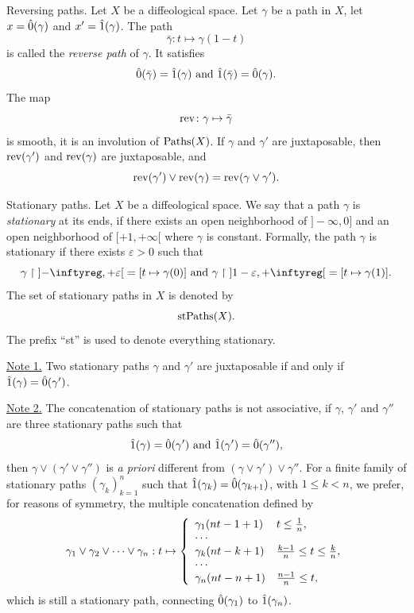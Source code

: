 \begin{Article}{Reversing paths.}{}
  \label{Reversing-paths}
  Let $X$ be a diffeological space.
  Let $\gamma$ be a path in $X$, let $x = \hat 0(\gamma)$ and $x' = \hat 1(\gamma)$.
  The path
  $$%
  \bar \gamma \colon t \mapsto \gamma(1-t)
  $$%
  is called the \emph{reverse path} of $\gamma$.
  It satisfies
  $$%
  \0(\bar \gamma) = \1(\gamma)
  \SpacedText{and}
  \1(\bar \gamma) = \0(\gamma).
  $$%
  The map
  $$%
  \Rev \colon \gamma \mapsto \bar \gamma
  $$%
  is  smooth,
  it is an involution of $\operatorname{Paths}(X)$.
  If $\gamma$ and $\gamma'$ are juxtaposable,
  then $\operatorname{rev}(\gamma')$ and $\operatorname{rev}(\gamma)$ are juxtaposable,
  and
  $$%
  \Rev(\gamma') \vee \Rev(\gamma) = \Rev(\gamma \vee \gamma').
  $$%
\end{Article} %

\begin{Article}{Stationary paths.}{}
  \label{Stationary-paths}
  Let $X$ be a diffeological space.
  We say that a path $\gamma$ is \emph{stationary} at its ends,
  if there exists an open neighborhood of $]-\infty,0]$ and  an open neighborhood of $[+1,+\infty[$ where $\gamma$ is constant.
  Formally,
  the path $\gamma$ is stationary if there exists $\varepsilon > 0$ such that
  $$%
    \gamma \restriction \OpenInterval{-\infty, + \varepsilon} = [t \mapsto \gamma(0)]
    \SpacedText{and}
    \gamma \restriction \OpenInterval{1 - \varepsilon, + \infty} = [t \mapsto \gamma(1)].
  $$%
  The set of stationary paths in $X$ is denoted by
  $$%
  \stPaths(X).
  $$%
  The prefix ``st'' is used to denote everything stationary.

  \uline{Note 1.} Two stationary paths $\gamma$ and $\gamma'$ are juxtaposable if and only if $\hat 1(\gamma) = \hat 0(\gamma')$.

  \uline{Note 2.} The concatenation of stationary paths is not associative,
  if $\gamma$, $\gamma'$ and $\gamma''$ are three stationary paths such that
  $$%
  \1(\gamma) = \0(\gamma')
  \SpacedText{and}
  \1(\gamma') = \0(\gamma''),
  $$%
  then $\gamma \vee (\gamma' \vee \gamma'')$ is {\em a priori\/} different from $(\gamma \vee \gamma') \vee \gamma''$.
  For a finite family of stationary paths $(\gamma_k)_{k=1}^n$ such that $\hat 1(\gamma_k) = \hat 0(\gamma_{k+1})$,
  with \hbox{$1\leq k<n$}, %
  we prefer,
  for reasons of symmetry,
  the multiple concatenation defined by
  $$%
  \gamma_1 \vee \gamma_2 \vee \cdots \vee \gamma_n : t
  \mapsto
  \left\{
  \begin{array}{ll}
    \gamma_1(nt - 1 +1) & t \leq {1 \over n}, \\
    \cdots \\
    \gamma_k(nt -k +1 ) & {k -1 \over n} \leq t \leq {k \over n}, \\
    \cdots \\
    \gamma_n(nt-n+1) & {n-1 \over n} \leq t,
  \end{array}
  \right.
  $$%
  which is still a stationary path, connecting $\hat 0(\gamma_1)$ to $\hat 1(\gamma_n)$.
\end{Article} %

